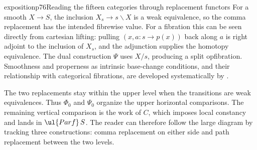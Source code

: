 \begin{dcomment}{exposition}{p76}{Reading the fifteen categories through replacement functors}
For a smooth $X\to S$, the inclusion $X_s\to s\backslash X$ is a weak equivalence, so the comma replacement has the intended fibrewise value. For a fibration this can be seen directly from cartesian lifting: pulling $(x,a:s\to p(x))$ back along $a$ is right adjoint to the inclusion of $X_s$, and the adjunction supplies the homotopy equivalence. The dual construction $\Psi$ uses $X/s$, producing a split opfibration. Smoothness and properness as intrinsic base-change conditions, and their relationship with categorical fibrations, are developed systematically by \citet[\S\S1 and~3]{Maltsiniotis2005Asphericite}.

The two replacements stay within the upper level when the transitions are weak equivalences. Thus $\Phi_0$ and $\Psi_0$ organize the upper horizontal comparisons. The remaining vertical comparison is the work of $C$, which imposes local constancy and lands in $\ul{Parf}\,S$. The reader can therefore follow the large diagram by tracking three constructions: comma replacement on either side and path replacement between the two levels.
\end{dcomment}

